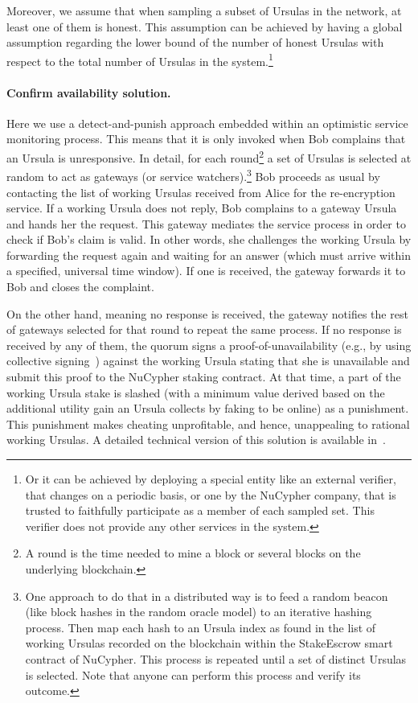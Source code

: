 \documentclass{llncs}
\begin{document}
Moreover, we assume that when sampling a subset of Ursulas in the network, at least one of them is honest. This assumption can be achieved by having a global assumption regarding the lower bound of the number of 
honest Ursulas with respect to the total number of Ursulas in the system.\footnote{Or it can be achieved by deploying a special entity like an external verifier, that changes on a periodic basis, or one by the NuCypher company, that is trusted to faithfully participate as a member of each sampled set. This verifier does not provide any other services in the system.}


\paragraph{Confirm availability solution.} Here we use a detect-and-punish approach embedded within an optimistic service monitoring process. This means that it is only invoked when Bob complains that an Ursula is unresponsive. In detail, for each round\footnote{A round is the time needed to mine a block or several blocks on the underlying blockchain.} a set of Ursulas is selected at random to act as gateways (or service watchers).\footnote{One approach to do that in a distributed way is to feed a random beacon (like block hashes in the random oracle model) to an iterative hashing process. Then map each hash to an Ursula index as found in the list of working Ursulas recorded on the blockchain within the StakeEscrow smart contract of NuCypher. This process is repeated until a set of distinct Ursulas is selected. Note that anyone can perform this process and verify its outcome.} Bob proceeds as usual by contacting the list of working Ursulas received from Alice for the re-encryption service. If a working Ursula does not reply, Bob complains to a gateway Ursula and hands her the request. This gateway mediates the service process in order to check if Bob's claim is valid. In other words, she challenges the working Ursula by forwarding the request again and waiting for an answer (which must arrive within a specified, universal time window). If one is received, the gateway forwards it to Bob and closes the complaint.


On the other hand, meaning no response is received, the gateway notifies the rest of gateways selected for that round to repeat the same process. If no response is received by any of them, the quorum signs a proof-of-unavailability (e.g., by using collective signing~\cite{syta2016keeping}) against the working Ursula stating that she is unavailable and submit this proof to the NuCypher staking contract. At that time, a part of the working Ursula stake is slashed (with a minimum value derived based on the additional utility gain an Ursula collects by faking to be online) as a punishment. This punishment makes cheating unprofitable, and hence, unappealing to rational working Ursulas. A detailed technical version of this solution is available in~\cite{confirm-activity-draft}.
\end{document}
